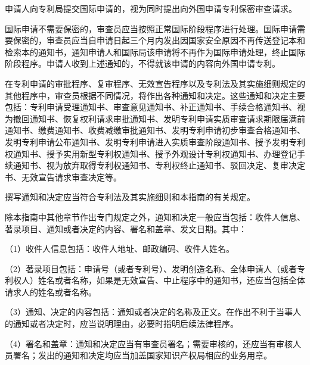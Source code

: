 申请人向专利局提交国际申请的，视为同时提出向外国申请专利保密审查请求。

国际申请不需要保密的，审查员应当按照正常国际阶段程序进行处理。国际申请需要保密的，审查员应当自申请日起三个月内发出因国家安全原因不再传送登记本和检索本的通知书，通知申请人和国际局该申请将不再作为国际申请处理，终止国际阶段程序。申请人收到上述通知的，不得就该申请的内容向外国申请专利。

在专利申请的审批程序、复审程序、无效宣告程序以及专利法及其实施细则规定的其他程序中，审查员根据不同情况，将作出各种通知和决定。这些通知和决定主要包括：专利申请受理通知书、审查意见通知书、补正通知书、手续合格通知书、视为撤回通知书、恢复权利请求审批通知书、发明专利申请实质审查请求期限届满前通知书、缴费通知书、收费减缴审批通知书、发明专利申请初步审查合格通知书、发明专利申请公布通知书、发明专利申请进入实质审查阶段通知书、授予发明专利权通知书、授予实用新型专利权通知书、授予外观设计专利权通知书、办理登记手续通知书、视为放弃取得专利权通知书、专利权终止通知书、驳回决定、复审决定书、无效宣告请求审查决定等。

撰写通知和决定应当符合专利法及其实施细则和本指南的有关规定。

除本指南中其他章节作出专门规定之外，通知和决定一般应当包括：收件人信息、著录项目、通知或者决定的内容、署名和盖章、发文日期。其中：

{\setlength{\parindent}{17.1bp}（1）收件人信息包括：收件人地址、邮政编码、收件人姓名。\par}

{\setlength{\parindent}{17.1bp}（2）著录项目包括：申请号（或者专利号）、发明创造名称、全体申请人（或者专利权人）姓名或者名称，如果是无效宣告、中止程序中的通知书，还应当包括全体请求人的姓名或者名称。\par}

{\setlength{\parindent}{17.1bp}（3）通知、决定的内容包括：通知或者决定的名称及正文。在作出不利于当事人的通知或者决定时，应当说明理由，必要时指明后续法律程序。\par}

{\setlength{\parindent}{17.1bp}（4）署名和盖章：通知和决定应当有审查员署名；需要审核的，还应当有审核人员署名；发出的通知和决定均应当加盖国家知识产权局相应的业务用章。\par}

